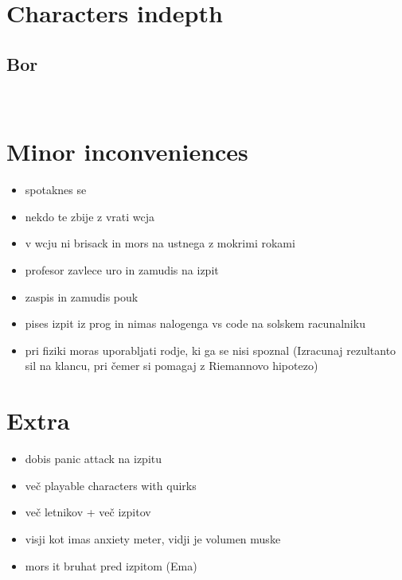 \documentclass[a4paper]{article}
\begin{document}
\section{Characters indepth}
\subsection*{Bor}
\

\section{Minor inconveniences}
\begin{itemize}
    \item spotaknes se
    \item nekdo te zbije z vrati wcja
    \item v wcju ni brisack in mors na ustnega z mokrimi rokami
    \item profesor zavlece uro in zamudis na izpit
    \item zaspis in zamudis pouk
    \item pises izpit iz prog in nimas nalogenga vs code na solskem racunalniku
    \item pri fiziki moras uporabljati rodje, ki ga se nisi spoznal (Izracunaj rezultanto sil na klancu, pri čemer si pomagaj z Riemannovo hipotezo)
\end{itemize}

\section{Extra}
\begin{itemize}
    \item dobis panic attack na izpitu
    \item več playable characters with quirks
    \item več letnikov + več izpitov
    \item visji kot imas anxiety meter, vidji je volumen muske
    \item mors it bruhat pred izpitom (Ema)
\end{itemize}
\end{document}
